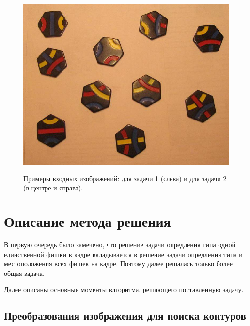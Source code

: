 \documentclass[10pt]{article}
\begin{document}
\begin{figure}[h]
\begin{minipage}[h]{0.3\linewidth}
\begin{center}
			\end{center}
		\end{minipage}
		\hfill
		\begin{minipage}[h]{0.3\linewidth}
			\begin{center}
				{\includegraphics[width=1.0\linewidth]{data/Group_5.pdf}}
			\end{center}
		\end{minipage}
		\caption{Примеры входных изображений: для задачи 1 (слева) и для задачи 2 (в центре и справа).}
		\label{ris:image2}
	\end{figure}
	
	
	\section*{Описание метода решения}
	
	В первую очередь было замечено, что решение задачи опредления типа одной единственной фишки в кадре вкладывается в решение задачи опредления типа и местоположения всех фишек на кадре. Поэтому далее решалась только более общая задача.
	
	Далее описаны основные моменты влгоритма, решающего поставленную задачу.
	
	
	\subsection*{Преобразования изображения для поиска контуров}
	
\end{document}
